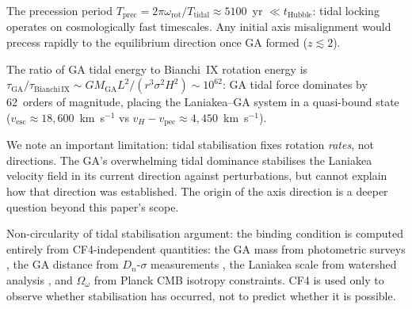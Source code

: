 \documentclass[12pt]{article}
\begin{document}
The precession period $T_\mathrm{prec}=2\pi\omega_\mathrm{rot}/T_\mathrm{tidal}
\approx5100$~yr $\ll t_\mathrm{Hubble}$: tidal locking operates on cosmologically
fast timescales. Any initial axis misalignment would precess rapidly to the
equilibrium direction once GA formed ($z\lesssim2$).

The ratio of GA tidal energy to Bianchi~IX rotation energy is
$\tau_\mathrm{GA}/\tau_\mathrm{Bianchi\,IX}
\sim GM_\mathrm{GA}L^2/(r^3\sigma^2 H^2)\sim10^{62}$:
GA tidal force dominates by 62~orders of magnitude, placing the Laniakea--GA
system in a quasi-bound state
($v_\mathrm{esc}\approx18{,}600$~km~s$^{-1}$ vs
$v_H-v_\mathrm{pec}\approx4{,}450$~km~s$^{-1}$).

We note an important limitation: tidal stabilisation fixes rotation \emph{rates},
not directions. The GA's overwhelming tidal dominance stabilises the Laniakea
velocity field in its current direction against perturbations, but cannot explain
how that direction was established. The origin of the axis direction is a deeper
question beyond this paper's scope.

Non-circularity of tidal stabilisation argument: the binding condition is
computed entirely from CF4-independent quantities: the GA mass from photometric
surveys \citep{LyndenBell1988, Carrick2015}, the GA distance from $D_n$-$\sigma$
measurements \citep{Dressler1988}, the Laniakea scale from watershed analysis
\citep{Tully2014}, and $\Omega_\omega$ from Planck CMB isotropy constraints.
CF4 is used only to observe whether stabilisation has occurred, not to predict
whether it is possible.
\end{document}
